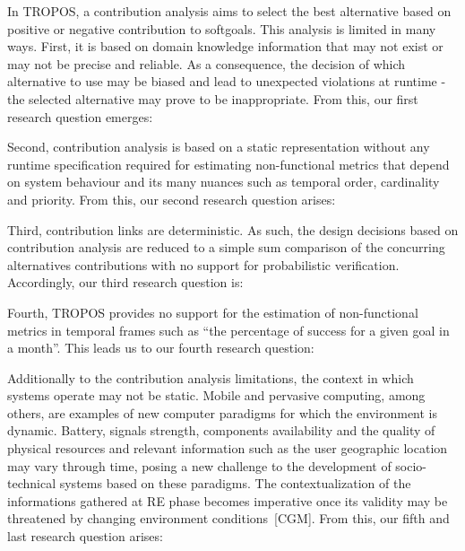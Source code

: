 In TROPOS, a contribution analysis aims to select the best alternative based on positive or negative contribution to  softgoals. This analysis is limited in many ways. First, it is based on domain knowledge information that may not exist or may not be precise and reliable. As a consequence, the decision of which alternative to use may be biased and lead to unexpected violations at runtime - the selected alternative may prove to be inappropriate. From this, our first research question emerges:
\bigskip

\setlength{\fboxsep}{10pt}
\noindent{}\bigskip

Second, contribution analysis is based on a static representation without any runtime specification required for estimating non-functional metrics that depend on system behaviour and its many nuances such as temporal order, cardinality and priority. From this, our second research question arises: 
\bigskip

\noindent{}\bigskip

Third, contribution links are deterministic. As such, the design decisions based on contribution analysis are reduced to a simple sum comparison of the concurring alternatives contributions with no support for probabilistic verification. Accordingly, our third research question is:
\bigskip

\noindent{}\bigskip

Fourth, TROPOS provides no support for the estimation of non-functional metrics in temporal frames such as ``the percentage of success for a given goal in a month''. This leads us to our fourth research question:
\bigskip

\noindent{}\bigskip

Additionally to the contribution analysis limitations, the context in which systems operate may not be static. Mobile and pervasive computing, among others, are examples of new computer paradigms for which the environment is dynamic. Battery, signals strength, components availability and the quality of physical resources and relevant information such as the user geographic location may vary through time, posing a new challenge to the development of socio-technical systems based on these paradigms. The contextualization of the informations gathered at RE phase becomes imperative once its validity may be threatened by changing environment conditions~[CGM]. From this, our fifth and last research question arises:
\bigskip

